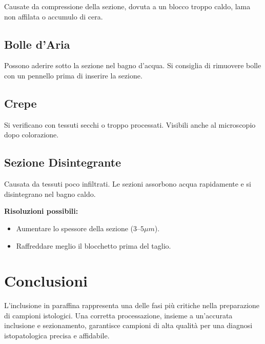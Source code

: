 Causate da compressione della sezione, dovuta a un blocco troppo caldo, lama non affilata o accumulo di cera.

\subsection{Bolle d'Aria}

Possono aderire sotto la sezione nel bagno d'acqua. Si consiglia di rimuovere bolle con un pennello prima di inserire la sezione.

\subsection{Crepe}

Si verificano con tessuti secchi o troppo processati. Visibili anche al microscopio dopo colorazione.

\subsection{Sezione Disintegrante}

Causata da tessuti poco infiltrati. Le sezioni assorbono acqua rapidamente e si disintegrano nel bagno caldo.

\textbf{Risoluzioni possibili:}
\begin{itemize}
    \item Aumentare lo spessore della sezione ($3–5\mu m$).
    \item Raffreddare meglio il blocchetto prima del taglio.
\end{itemize}


\section{Conclusioni}

L'inclusione in paraffina rappresenta una delle fasi più critiche nella preparazione di campioni istologici. Una corretta processazione, insieme a un'accurata inclusione e sezionamento, garantisce campioni di alta qualità per una diagnosi istopatologica precisa e affidabile.

